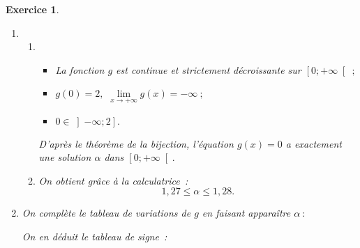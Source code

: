 \documentclass[10pt]{article}
\newtheorem{exo}{Exercice}
\begin{document}
\begin{exo}
\begin{enumerate}
\begin{multicols}{2}
\[g(0)=\text{e}^0 - 0\times \text{e}^0 + 1=2.\]

\end{multicols}
\item 
	\begin{enumerate}
		\item \begin{itemize}
\item[\textbullet] La fonction $g$ est continue et strictement décroissante sur $\left[0;+\infty\right[~;$
\item[\textbullet] $g(0)=2,$ $\lim\limits_{x\to +\infty}g(x)=-\infty~;$
\item[\textbullet] $0\in\left]-\infty;2\right].$
\end{itemize}

D'après le théorème de la bijection, l'équation $g(x)=0$ a exactement une solution  $\alpha$ dans $\left[0;+\infty\right[.$
		
		
		\item On obtient grâce à la calculatrice~:
		\[1,27\leq \alpha\leq 1,28.\] 
		
	\end{enumerate} 
\item \setlength{\columnseprule}{1pt}

\begin{multicols}{2} 

On complète le tableau de variations de $g$ en faisant apparaître $\alpha~:$

\medskip
\begin{center}
\end{center}
\medskip

On en déduit le tableau de signe~:

\medskip
\begin{center}
\end{center}


\end{multicols}
\end{enumerate}
\end{exo}
\end{document}
